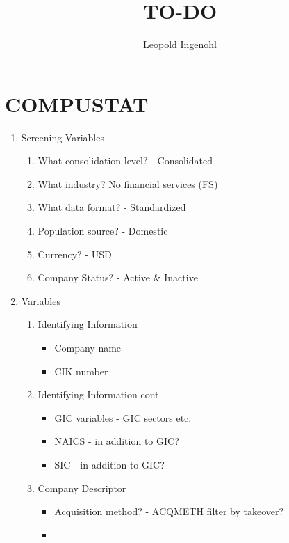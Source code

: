 \documentclass[12pt]{article}
\title{TO-DO}
\author{Leopold Ingenohl}
\begin{document}
\maketitle

\section{COMPUSTAT}
\begin{enumerate}

    \item Screening Variables
   
    \begin{enumerate}
        \item What consolidation level? - Consolidated
        \item What industry? No financial services (FS) 
        \item What data format?  - Standardized 
        \item Population source? - Domestic 
        \item Currency? - USD 
        \item Company Status? - Active \& Inactive  
    \end{enumerate}
   
    \item Variables 
    
    \begin{enumerate}
        \item Identifying Information
        \begin{itemize}
            \item Company name 
            \item CIK number 
        \end{itemize}
    
        \item Identifying Information cont.  
        \begin{itemize}
            \item GIC variables - GIC sectors etc.
            \item NAICS - in addition to GIC? 
            \item SIC - in addition to GIC?
        \end{itemize}

        \item Company Descriptor
        \begin{itemize}
            \item Acquisition method? - ACQMETH filter by takeover? 
            \item 
        \end{itemize}
        

\end{enumerate}
\end{enumerate}
\end{document}
